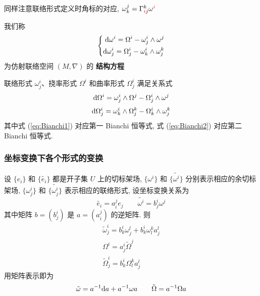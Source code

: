         \begin{remark}
            同样注意联络形式定义时角标的对应, $\omega_{k}^{j} = \Gamma_{\textcolor{red}{i}j}^{k}\omega^{\textcolor{red}{i}}$
        \end{remark}
        \begin{definition}[结构方程]
            我们称
            \begin{equation}
                \left\{
                \begin{aligned}
                    {\rm d}\omega^i = \Omega^i-\omega^i_j\wedge\omega^j \\
                    {\rm d}\omega^i_j = \Omega^i_j-\omega^i_k\wedge\omega^k_j
                \end{aligned}
                \right.
            \end{equation}
            为仿射联络空间 $(M,\nabla)$ 的 \textbf{结构方程}
        \end{definition}

        \begin{theorem}[第一、第二Bianchi恒等式]
            联络形式 $\omega^i_j$、挠率形式 $\Omega^i$ 和曲率形式 $\Omega^i_j$ 满足关系式
            \begin{equation} \label{eq:Bianchi1}
                {\rm d}\Omega^i = \omega^i_j\wedge\Omega^j-\Omega^i_j\wedge\omega^j
            \end{equation}
            \begin{equation} \label{eq:Bianchi2}
                {\rm d}\Omega^i_j = \omega^i_k\wedge\Omega^k_j-\Omega^i_k\wedge\omega^k_j
            \end{equation}
            其中式 (\ref{eq:Bianchi1}) 对应第一 \rm{Bianchi} 恒等式, 式 (\ref{eq:Bianchi2}) 对应第二 \rm{Bianchi} 恒等式.
        \end{theorem}
    \subsubsection{坐标变换下各个形式的变换}
        设 $\{e_i\}$ 和 $\{\tilde{e_i}\}$ 都是开子集 $U$ 上的切标架场, $\{\omega^i\}$ 和 $\{\tilde{\omega^i}\}$ 分别表示相应的余切标架场,
        $\{\omega^i_j\}$ 和 $\{\tilde{\omega^i_j}\}$ 表示相应的联络形式, 设坐标变换关系为
        \begin{equation*}
            \tilde{e_i} = a^j_ie_j\qquad \tilde{\omega^i} = b^i_j\omega^j
        \end{equation*}
        其中矩阵 $b = (b^i_j)$ 是 $a = (a^j_i)$ 的逆矩阵.
        则
        \begin{gather*}
            \tilde{\omega}^i_j = b^i_k\omega^l_j+b^i_k\omega^k_la^l_j \\
            \Omega^i = a^i_j\tilde{\Omega}^j \\
            \tilde{\Omega}^i_j = b^i_k\Omega^k_la^l_j
        \end{gather*}
        用矩阵表示即为
        \begin{equation*}
            \tilde{\omega} = a^{-1}{\rm d} a + a^{-1}\omega a \qquad \tilde{\Omega} = a^{-1}\Omega a
        \end{equation*}

